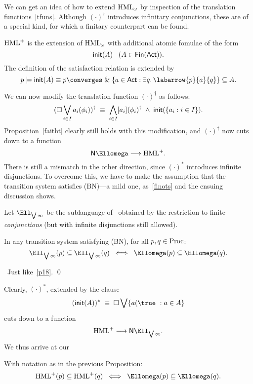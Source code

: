 We can get an idea of how to extend $ {\rm HML}_{\omega}$ by inspection of the translation functions~\ref{tfuns}.
Although $( \cdot )^{\dagger}$ introduces infinitary conjunctions, these are of a special kind, for which a finitary counterpart can be found.

\begin{definition} 
{\rm ${\rm HML}^{+}$ is the extension of ${\rm HML}_{\omega}$ with additional atomic fomulae of the form
\[ {\sf init}(A) \;\;\; (A \in {\sf Fin}({\sf Act})). \]
The definition of the satisfaction relation is extended by
\[ p \models {\sf init}(A)  \equiv  p \converges \; \& \; \{ a \in {\sf Act} : \exists q . \, \labarrow{p}{a}{q} \} \subseteq A . \] }
\end{definition}

We can now modify the translation function $( \cdot )^{\dagger}$ as follows:
\[ ( \Box \bigvee_{i \in I} a_{i} ( \phi_{i} ))^{\dagger} \; \equiv \; \bigwedge_{i \in I} [a_{i}] ( \phi_{i})^{\dagger} \; \wedge \; {\sf init}(\{ a_{i} : i \in I \} ). \]
Proposition~\ref{faitht} clearly still holds with this modification, and $( \cdot )^{\dagger}$ now cuts down to a function
\[ {\sf N} \Ellomega \longrightarrow {\rm HML}^{+}. \]
There is still a mismatch in the other direction, since $( \cdot )^{\ast}$ introduces infinite disjunctions.
To overcome this, we have to make the assumption that the transition system satisfies (BN)---a mild one, as~\ref{finots} and the ensuing discussion shows.

Let $\Ell_{\bigvee \infty}$ be the sublanguage of \Ellinfty\ obtained by the restriction to finite {\em conjunctions} (but with infinite disjunctions still allowed).
\begin{proposition} 
In any transition system satisfying (BN), for all $p, q \in {\rm Proc}$:
\[ \Ell_{\bigvee \infty}(p) \subseteq \Ell_{\bigvee \infty}(q) \;\; \Longleftrightarrow \;\; \Ellomega(p) \subseteq \Ellomega(q) . \]
\end{proposition}

\proof\ Just like~\ref{p18}. \qed

Clearly, $( \cdot )^{\ast}$, extended by the clause
\[ ({\sf init}(A))^{\ast} \; \equiv \; \Box \bigvee \{ a(\true\ : a \in A \} \]
cuts down to a function
\[ {\rm HML}^{+}  \longrightarrow  {\sf N} \Ell_{\bigvee \infty} . \]
We thus arrive at our
\begin{theorem}
With notation as in the previous Proposition:
\[ {\rm HML}^{+}(p) \subseteq {\rm HML}^{+}(q) \;\; \Longleftrightarrow \;\; \Ellomega (p) \subseteq \Ellomega (q) . \]
\end{theorem}
